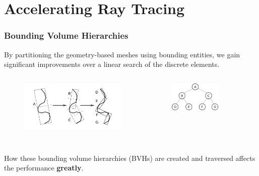 \documentclass[12pt]{beamer}
\begin{document}
\section{Accelerating Ray Tracing} %


\begin{frame}
\frametitle{Bounding Volume Hierarchies}


By partitioning the geometry-based meshes using bounding entities, we gain significant improvements over a linear search of the discrete elements.
\begin{columns}
  \begin{figure}
    \centering
    \includegraphics[width=1.1\textwidth]{bvh_2d_ex_w_labels.png}
    \begin{flushleft}{\scriptsize \cite{gottschalk1996obbtree}}\end{flushleft}
  \end{figure}
  
  \begin{figure}
    \centering
    \includegraphics[width=0.7\textwidth]{binary_graph.png}
  \end{figure}
\end{columns}
\vfill
How these bounding volume hierarchies (BVHs) are created and traversed affects the performance \textbf{greatly}.


\end{frame}
\end{document}
